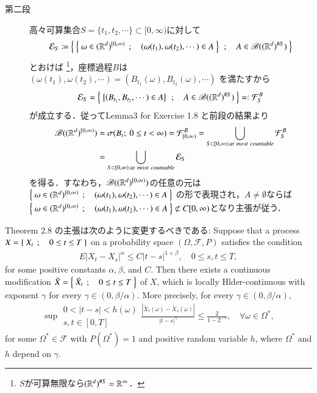 \begin{prf}
\begin{description}
			\item[第二段]
				高々可算集合$S = \{t_1,t_2,\cdots\} \subset [0,\infty)$に対して
				\begin{align}
					\mathcal{E}_S \coloneqq \left\{\ \left\{\ \omega \in (\mathbb{R}^d)^{[0,\infty)}\ \, ; \quad (\omega(t_1),\omega(t_2),\cdots) \in A\ \right\}\ \, ; \quad A \in \mathscr{B}((\mathbb{R}^d)^{\# S})\ \right\}
				\end{align}
				とおけば
				\footnote{
					$S$が可算無限なら$(\mathbb{R}^d)^{\# S} = \mathbb{R}^\infty$．
				}，座標過程$B$は
				$(\omega(t_1),\omega(t_2),\cdots) = (B_{t_1}(\omega),B_{t_2}(\omega),\cdots)$
				を満たすから
				\begin{align}
					\mathcal{E}_S = \left\{\ \left\{(B_{t_1},B_{t_2},\cdots) \in A\right\}\ \, ; \quad A \in \mathscr{B}((\mathbb{R}^d)^{\# S})\ \right\} =\mathrel{\mathop:} \mathcal{F}^B_S
				\end{align}
				が成立する．従ってLemma3 for Exercise 1.8 と前段の結果より
				\begin{align}
					\borel{(\R^d)^{[0,\infty)}}
					&= \sigma(B_t;\ 0 \leq t < \infty)
					= \mathcal{F}^B_{[0,\infty)}
					= \bigcup_{S \subset [0,\infty):at\ most\ countable} \mathcal{F}^B_S\\
					&= \bigcup_{S \subset [0,\infty):at\ most\ countable} \mathcal{E}_S
				\end{align}
				を得る．すなわち，$\mathscr{B}((\mathbb{R}^d)^{[0,\infty)})$の任意の元は
				$\left\{\ \omega \in (\mathbb{R}^d)^{[0,\infty)}\ \, ; \quad (\omega(t_1),\omega(t_2),\cdots) \in A\ \right\}$
				の形で表現され，$A \neq \emptyset$ならば
				$\left\{\ \omega \in (\mathbb{R}^d)^{[0,\infty)}\ \, ; \quad (\omega(t_1),\omega(t_2),\cdots) \in A\ \right\} \not\subset C[0,\infty)$となり主張が従う．
				\QED
		\end{description}
	\end{prf}
	
	\begin{itembox}[l]{Theorem 2.8 の主張は次のように変更するべきである:}
		Suppose that a process $X = \left\{\ X_t\ \, ; \quad 0 \leq t \leq T\ \right\}$ on a probability space 
		$(\Omega,\mathscr{F},P)$ satisfies the condition
		\begin{align}
			E|X_t - X_s|^\alpha \leq C|t-s|^{1 + \beta},
			\quad 0 \leq s,t \leq T,
		\end{align}
		for some positive constants $\alpha,\beta$, and $C$. Then there exists a 
		continuous modification $\tilde{X} = \left\{\ \tilde{X}_t\ \, ; \quad 0 \leq t \leq T\ \right\}$ of $X$, 
		which is locally Hlder-continuous with exponent $\gamma$ for every 
		$\gamma \in (0,\beta/\alpha)$. More precisely, for every $\gamma \in (0,\beta/\alpha)$,
		\begin{align}
			\sup{\substack{0 < |t-s| < h(\omega) \\ s,t \in [0,T]}}{\frac{\left| \tilde{X}_t(\omega) - \tilde{X}_s(\omega) \right|}{|t-s|^\gamma}} \leq \frac{2}{1-2^{-\gamma}},
			\quad \forall \omega \in \Omega^*,
		\end{align}
		for some $\Omega^* \in \mathscr{F}$ with $P(\Omega^*)=1$ and 
		positive random variable $h$, where $\Omega^*$ and $h$ depend on $\gamma$.
	\end{itembox}
	
